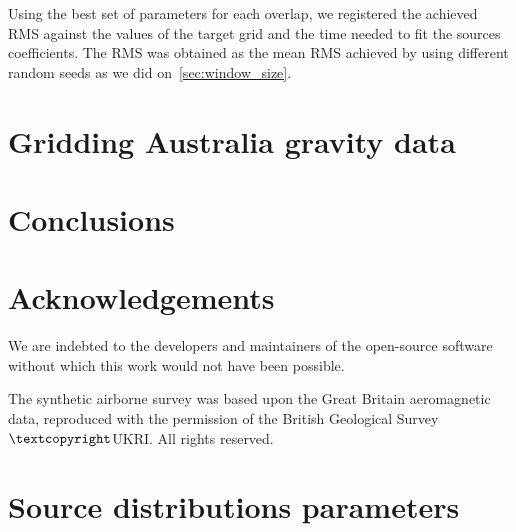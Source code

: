 \documentclass[twocolumn]{article}
\begin{document}
Using the best set of parameters for each overlap, we registered the achieved
RMS against the values of the target grid and the time needed to fit the
sources coefficients.
The RMS was obtained as the mean RMS achieved by using different random seeds
as we did on~\ref{sec:window_size}.



\section{Gridding Australia gravity data}


\section{Conclusions}


\section{Acknowledgements}

We are indebted to the developers and maintainers of the open-source software
without which this work would not have been possible.

The synthetic airborne survey was based upon the Great Britain aeromagnetic
data, reproduced with the permission of the British Geological Survey
$\textcopyright$UKRI\@.
All rights reserved.


\appendix

\section{Source distributions parameters}
\end{document}
